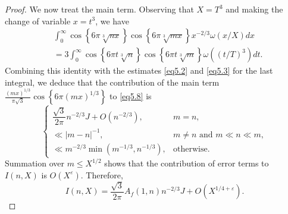 \documentclass[10pt,leqno]{amsart}
\numberwithin{equation}{section}
\begin{document}
\begin{proof}
We now treat the main term. Observing that $X = T^3$ and making the change of variable $x = t^3$, we have
\[
\begin{aligned}
&\int_0^{\infty} \cos \left\{6\pi\sqrt[3]{n x}\right\} \cos \left\{6\pi\sqrt[3]{m x}\right\} x^{-2/3} \omega(x/X)   dx \\
&= 3 \int_0^{\infty} \cos \left\{6\pi t\sqrt[3]{n}\right\} \cos \left\{6\pi t\sqrt[3]{m}\right\} \omega \left((t/T)^3\right) dt.
\end{aligned}
\]
Combining this identity with the estimates \eqref{eq5.2} and \eqref{eq5.3} for the last integral, we deduce that the contribution of the main term $\frac{(mx)^{1/3}}{\pi\sqrt{3}} \cos\left\{6\pi (mx)^{1/3}\right\}$ to \eqref{eq5.8} is
\[
\begin{cases}
\dfrac{\sqrt{3}}{2\pi}   n^{-2/3} J + O\left(n^{-2/3}\right), & m = n, \\[8pt]
\ll |m - n|^{-1}, & m \ne n \text{ and } m \ll n \ll m, \\[8pt]
\ll m^{-2/3} \min\left(m^{-1/3}, n^{-1/3}\right), & \text{otherwise}.
\end{cases}
\]
Summation over $m \le X^{1/2}$ shows that the contribution of error terms to $I(n, X)$ is $O\left(X^{\varepsilon}\right)$. Therefore,
\begin{equation}\label{eq:I-estimate}
I(n, X) = \frac{\sqrt{3}}{2\pi}   A_f(1, n)   n^{-2/3} J + O\left(X^{1/4+\varepsilon}\right).
\end{equation}


\end{proof}
\end{document}

